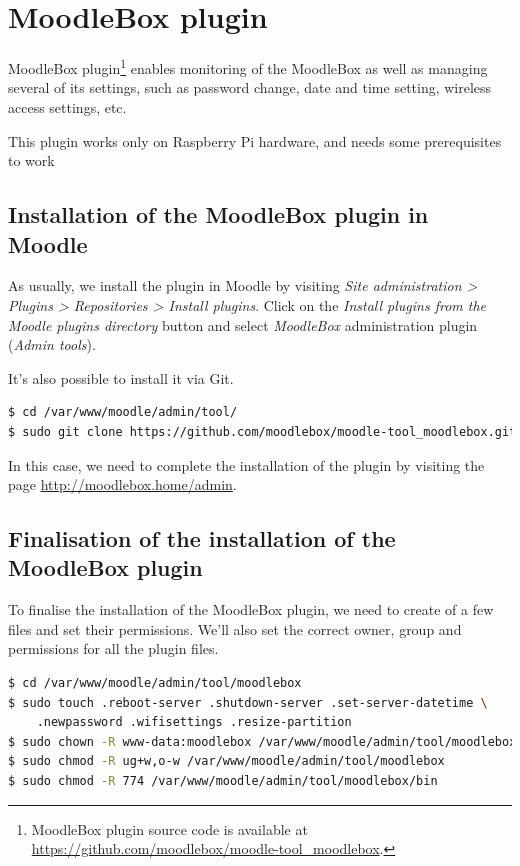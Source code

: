 \documentclass[12pt]{article}
\begin{document}

\section{MoodleBox plugin}

MoodleBox plugin\footnote{MoodleBox plugin source code is available at \url{https://github.com/moodlebox/moodle-tool_moodlebox}.} enables monitoring of the MoodleBox as well as managing several of its settings, such as password change, date and time setting, wireless access settings, etc.

This plugin works only on Raspberry Pi hardware, and needs some prerequisites to work

\subsection{Installation of the MoodleBox plugin in Moodle}

As usually, we install the plugin in Moodle by visiting \emph{Site administration > Plugins > Repositories > Install plugins}.
Click on the \emph{Install plugins from the Moodle plugins directory} button and select \emph{MoodleBox} administration plugin (\emph{Admin tools}).

It's also possible to install it via Git.

\begin{lstlisting}[language=bash]
$ cd /var/www/moodle/admin/tool/
$ sudo git clone https://github.com/moodlebox/moodle-tool_moodlebox.git moodlebox
\end{lstlisting}

In this case, we need to complete the installation of the plugin by visiting the page \url{http://moodlebox.home/admin}.

\subsection{Finalisation of the installation of the MoodleBox plugin}

To finalise the installation of the MoodleBox plugin, we need to create of a few files and set their permissions.
We'll also set the correct owner, group and permissions for all the plugin files.
\begin{lstlisting}[language=bash]
$ cd /var/www/moodle/admin/tool/moodlebox
$ sudo touch .reboot-server .shutdown-server .set-server-datetime \ 
    .newpassword .wifisettings .resize-partition
$ sudo chown -R www-data:moodlebox /var/www/moodle/admin/tool/moodlebox
$ sudo chmod -R ug+w,o-w /var/www/moodle/admin/tool/moodlebox
$ sudo chmod -R 774 /var/www/moodle/admin/tool/moodlebox/bin
\end{lstlisting}
\end{document}
